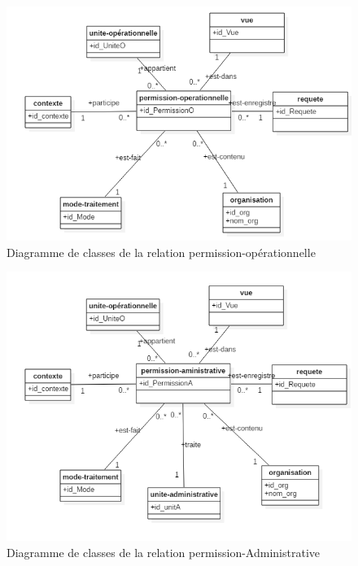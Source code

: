 \begin{figure}[h!]
    \centering
		\includegraphics[scale=0.7]{chap3/images/permissionO.png}
    \caption{Diagramme de classes de la relation permission-opérationnelle}
	 \label{figpermissionO}
\end{figure} 

\begin{figure}[h!]
    \centering
		\includegraphics[scale=0.7]{chap3/images/permissionA.png}
    \caption{Diagramme de classes de la relation permission-Administrative}
	 \label{figpermissionA}
\end{figure} 

\label{sectionSuggererTraiter}


